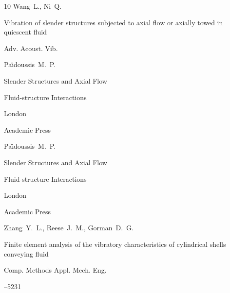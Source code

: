 \begin{thebibliography}{10}
\by Wang~L., Ni~Q.

\paper Vibration of slender structures subjected to axial flow or axially towed in quiescent fluid

\jour Adv. Acoust. Vib.








\by Pa\"{\i}doussis~M.~P.

\book Slender Structures and Axial Flow

\serial Fluid-structure Interactions


\publaddr London

\publ Academic Press



\moreref 





\by Pa\"{\i}doussis~M.~P.

\book  Slender Structures and Axial Flow


\serial Fluid-structure Interactions

\publaddr London

\publ Academic Press



\moreref 





\by Zhang~Y.~L., Reese~J.~M., Gorman~D.~G.

\paper Finite element analysis of the vibratory characteristics of cylindrical shells conveying fluid

\jour Comp. Methods Appl. Mech. Eng.



--5231



\end{thebibliography}
